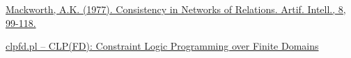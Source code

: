 \documentclass{article}
\begin{document}
\begin{itemize}
\begin{thebibliography}
    \bibitem[26]{} \href{https://www.sciencedirect.com/science/article/abs/pii/0004370277900078?via%3Dihub}{Mackworth, A.K. (1977). Consistency in Networks of Relations. Artif. Intell., 8, 99-118.}
    \label{sec:36}

    \bibitem[37]{} \href{https://www.swi-prolog.org/pldoc/doc/_SWI_/library/clp/clpfd.pl}{clpfd.pl -- CLP(FD): Constraint Logic Programming over Finite Domains}
    \label{sec:27}




    \end{thebibliography}

\end{itemize}
\end{document}
